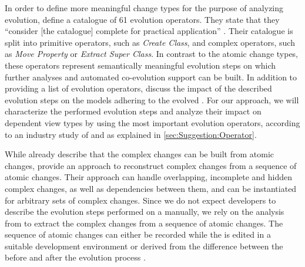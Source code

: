 In order to define more meaningful change types for the purpose of analyzing \metamodel evolution, \textcite{herrmannsdoerfer_extensive_2011} define a catalogue of 61 \metamodel evolution operators.
They state that they ``consider [the catalogue] complete for practical application'' \cite{herrmannsdoerfer_extensive_2011}.
Their catalogue is split into primitive operators, such as \emph{Create Class}, and complex operators, such as \emph{Move Property} or \emph{Extract Super Class}.
In contrast to the atomic change types, these operators represent semantically meaningful evolution steps on which further analyses and automated co-evolution support can be built.
In addition to providing a list of \metamodel evolution operators, \textcite{herrmannsdoerfer_extensive_2011} discuss the impact of the described evolution steps on the models adhering to the evolved \metamodels.
For our approach, we will characterize the performed evolution steps and analyze their impact on dependent view types by using the most important evolution operators, according to an industry study of \textcite{khelladi_detecting_2015} and as explained in \cref{sec:Suggestion:Operator}.

While \textcite{herrmannsdoerfer_extensive_2011} already describe that the complex changes can be built from atomic changes, \textcite{khelladi_change_2018} provide an approach to reconstruct complex changes from a sequence of atomic changes.
Their approach can handle overlapping, incomplete and hidden complex changes, as well as dependencies between them, and can be instantiated for arbitrary sets of complex changes.
Since we do not expect developers to describe the evolution steps performed on a \metamodel manually, we rely on the analysis from \textcite{khelladi_change_2018} to extract the complex changes from a sequence of atomic changes.
The sequence of atomic changes can either be recorded while the \metamodel is edited in a suitable development environment or derived from the difference between the \metamodel before and after the evolution process \cite{wittler_differencing_2023}.
